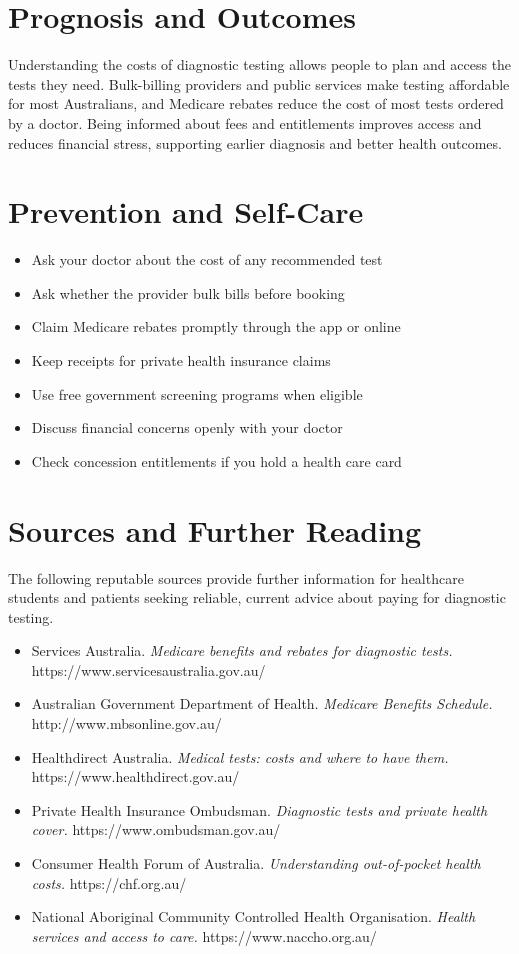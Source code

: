 \section*{Prognosis and Outcomes}
Understanding the costs of diagnostic testing allows people to plan and access the tests they need. Bulk-billing providers and public services make testing affordable for most Australians, and Medicare rebates reduce the cost of most tests ordered by a doctor. Being informed about fees and entitlements improves access and reduces financial stress, supporting earlier diagnosis and better health outcomes.

\section*{Prevention and Self-Care}
\begin{itemize}
    \item Ask your doctor about the cost of any recommended test
    \item Ask whether the provider bulk bills before booking
    \item Claim Medicare rebates promptly through the app or online
    \item Keep receipts for private health insurance claims
    \item Use free government screening programs when eligible
    \item Discuss financial concerns openly with your doctor
    \item Check concession entitlements if you hold a health care card
\end{itemize}

\section*{Sources and Further Reading}
The following reputable sources provide further information for healthcare students and patients seeking reliable, current advice about paying for diagnostic testing.

\begin{itemize}
    \item Services Australia. \textit{Medicare benefits and rebates for diagnostic tests.} https://www.servicesaustralia.gov.au/
    \item Australian Government Department of Health. \textit{Medicare Benefits Schedule.} http://www.mbsonline.gov.au/
    \item Healthdirect Australia. \textit{Medical tests: costs and where to have them.} https://www.healthdirect.gov.au/
    \item Private Health Insurance Ombudsman. \textit{Diagnostic tests and private health cover.} https://www.ombudsman.gov.au/
    \item Consumer Health Forum of Australia. \textit{Understanding out-of-pocket health costs.} https://chf.org.au/
    \item National Aboriginal Community Controlled Health Organisation. \textit{Health services and access to care.} https://www.naccho.org.au/
\end{itemize}
